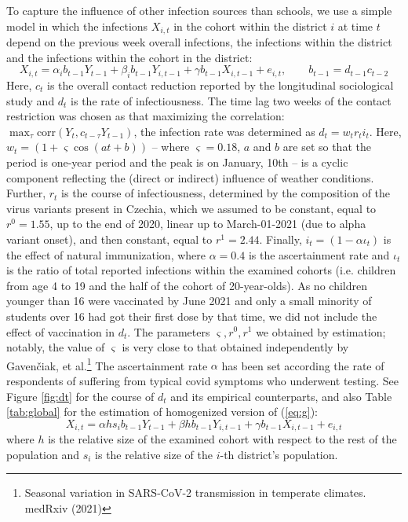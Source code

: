 \documentclass[fleqn,10pt]{wlscirep}
\begin{document}
To capture the influence of other infection sources than schools, we use a simple model in which the infections $X_{i,t}$ in the cohort within the district $i$ at time $t$ depend on the previous week overall infections, the infections within the district and the infections within the cohort in the district:
\begin{equation}
X_{i,t} = \alpha_i b_{t-1} Y_{t-1} + \beta_i b_{t-1} Y_{i,t-1} + \gamma b_{t-1} X_{i,t-1}
+ e_{i,t},\qquad b_{t-1} = d_{t-1} c_{t-2}
\label{eq:g}
\end{equation}
Here, $c_{t}$ is the overall contact reduction reported by the longitudinal sociological study \cite{paqcovid} and $d_t$ is the rate of infectiousness. The time lag two weeks of the contact restriction was chosen as that maximizing the correlation: $\max_\tau \mathrm{corr}(Y_t,c_{t-\tau} Y_{t-1})$, the infection rate was determined as $d_t = w_t r_t i_t$. Here, $w_t = (1 + \varsigma \cos(at+b))$ -- where $\varsigma = 0.18$, $a$ and $b$ are set so that the period is one-year period and the peak is on January, 10th -- is a cyclic component reflecting the (direct or indirect) influence of weather conditions. Further, $r_t$ is the course of infectiousness, determined by the composition of the virus variants present in Czechia, which we assumed to be constant, equal to $r^0=1.55$, up to the end of 2020, linear up to March-01-2021 (due to alpha variant onset), and then constant, equal to $r^1=2.44$. Finally, $i_t= (1-\alpha \iota_t)$ is the effect of natural immunization, where $\alpha=0.4$ is the ascertainment rate and $\iota_t$ is the ratio of total reported infections within the examined cohorts (i.e. children from age 4 to 19 and the half of the cohort of 20-year-olds).  As no children younger than 16 were vaccinated by June 2021 and only a small minority of students over 16 had got their first dose by that time, we did not include the effect of vaccination in $d_t$. The parameters $\varsigma, r^0, r^1 $ we obtained by estimation; notably, the value of $\varsigma$ is very close to that obtained independently by Gaven\v ciak, et al.\footnote{Seasonal variation in SARS-CoV-2 transmission in temperate climates. medRxiv (2021)} The ascertainment rate $\alpha$ has been set according the rate of respondents of \cite{paqcovid} suffering from typical covid symptoms who underwent testing. See Figure \ref{fig:dt} for the course of $d_t$ and its empirical counterparts, and also Table \ref{tab:global} for the estimation of homogenized version of (\ref{eq:g}):
\begin{equation}
X_{i,t} = \alpha h s_i b_{t-1} Y_{t-1} + \beta h b_{t-1} Y_{i,t-1} + \gamma b_{t-1} X_{i,t-1}
+ e_{i,t}
\label{eq:global}
\end{equation}
where $h$ is the relative size of the examined cohort with respect to the rest of the population and $s_i$ is the relative size of the $i$-th district's population.
\end{document}
